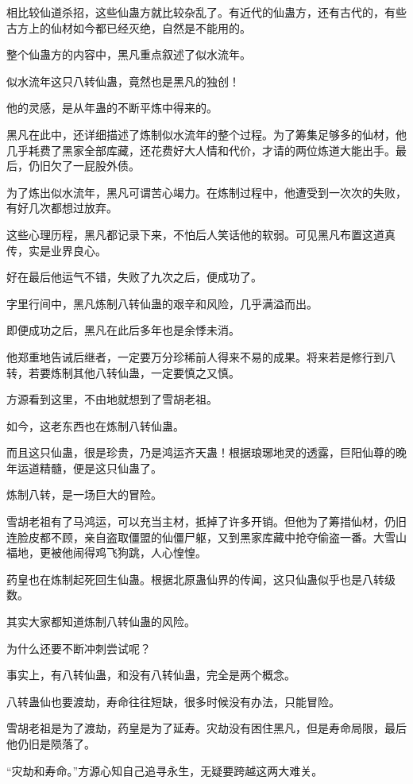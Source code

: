 \begin{this_body}
相比较仙道杀招，这些仙蛊方就比较杂乱了。有近代的仙蛊方，还有古代的，有些古方上的仙材如今都已经灭绝，自然是不能用的。

整个仙蛊方的内容中，黑凡重点叙述了似水流年。

似水流年这只八转仙蛊，竟然也是黑凡的独创！

他的灵感，是从年蛊的不断平炼中得来的。

黑凡在此中，还详细描述了炼制似水流年的整个过程。为了筹集足够多的仙材，他几乎耗费了黑家全部库藏，还花费好大人情和代价，才请的两位炼道大能出手。最后，仍旧欠了一屁股外债。

为了炼出似水流年，黑凡可谓苦心竭力。在炼制过程中，他遭受到一次次的失败，有好几次都想过放弃。

这些心理历程，黑凡都记录下来，不怕后人笑话他的软弱。可见黑凡布置这道真传，实是业界良心。

好在最后他运气不错，失败了九次之后，便成功了。

字里行间中，黑凡炼制八转仙蛊的艰辛和风险，几乎满溢而出。

即便成功之后，黑凡在此后多年也是余悸未消。

他郑重地告诫后继者，一定要万分珍稀前人得来不易的成果。将来若是修行到八转，若要炼制其他八转仙蛊，一定要慎之又慎。

方源看到这里，不由地就想到了雪胡老祖。

如今，这老东西也在炼制八转仙蛊。

而且这只仙蛊，很是珍贵，乃是鸿运齐天蛊！根据琅琊地灵的透露，巨阳仙尊的晚年运道精髓，便是这只仙蛊了。

炼制八转，是一场巨大的冒险。

雪胡老祖有了马鸿运，可以充当主材，抵掉了许多开销。但他为了筹措仙材，仍旧连脸皮都不顾，亲自盗取僵盟的仙僵尸躯，又到黑家库藏中抢夺偷盗一番。大雪山福地，更被他闹得鸡飞狗跳，人心惶惶。

药皇也在炼制起死回生仙蛊。根据北原蛊仙界的传闻，这只仙蛊似乎也是八转级数。

其实大家都知道炼制八转仙蛊的风险。

为什么还要不断冲刺尝试呢？

事实上，有八转仙蛊，和没有八转仙蛊，完全是两个概念。

八转蛊仙也要渡劫，寿命往往短缺，很多时候没有办法，只能冒险。

雪胡老祖是为了渡劫，药皇是为了延寿。灾劫没有困住黑凡，但是寿命局限，最后他仍旧是陨落了。

“灾劫和寿命。”方源心知自己追寻永生，无疑要跨越这两大难关。

\end{this_body}

